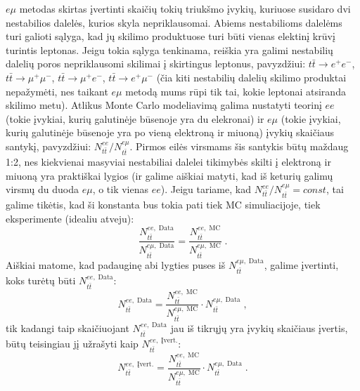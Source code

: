 \documentclass[a4paper, 12pt]{article}
\newlength\q
\begin{document}
$e\mu$ metodas skirtas įvertinti skaičių tokių triukšmo įvykių, kuriuose susidaro dvi nestabilios dalelės, kurios skyla nepriklausomai. Abiems nestabilioms dalelėms turi galioti sąlyga, kad jų skilimo produktuose turi būti vienas elektinį krūvį turintis leptonas. Jeigu tokia sąlyga tenkinama, reiškia yra galimi nestabilių dalelių poros nepriklausomi skilimai į skirtingus leptonus, pavyzdžiui: $t\bar{t}\rightarrow e^{+}e^{-}$, $t\bar{t}\rightarrow\mu^{+}\mu^{-}$, $t\bar{t}\rightarrow\mu^{+}e^{-}$, $t\bar{t}\rightarrow e^{+}\mu^{-}$ (čia kiti nestabilių dalelių skilimo produktai nepažymėti, nes taikant $e\mu$ metodą mums rūpi tik tai, kokie leptonai atsiranda skilimo metu). Atlikus Monte Carlo modeliavimą galima nustatyti teorinį $ee$ (tokie įvykiai, kurių galutinėje būsenoje yra du elekronai) ir $e\mu$ (tokie įvykiai, kurių galutinėje būsenoje yra po vieną elektroną ir miuoną) įvykių skaičiaus santykį, pavyzdžiui: $N_{t\bar{t}}^{ee}/N_{t\bar{t}}^{e\mu}$. Pirmos eilės virsmams šis santykis būtų maždaug 1:2, nes kiekvienai masyviai nestabiliai dalelei tikimybės skilti į elektroną ir miuoną yra praktiškai lygios (ir galime aiškiai matyti, kad iš keturių galimų virsmų du duoda $e\mu$, o tik vienas $ee$). Jeigu tariame, kad $N_{t\bar{t}}^{ee}/N_{t\bar{t}}^{e\mu}=const$, tai galime tikėtis, kad ši konstanta bus tokia pati tiek MC simuliacijoje, tiek eksperimente (idealiu atveju):
\begin{equation}
\frac{N_{t\bar{t}}^{ee , \; \mathrm{Data}}}{N_{t\bar{t}}^{e\mu , \; \mathrm{Data}}}=\frac{N_{t\bar{t}}^{ee , \; \mathrm{MC}}}{N_{t\bar{t}}^{e\mu , \; \mathrm{MC}}} \; .
\label{eq:emuDataMC}
\end{equation}
Aiškiai matome, kad padauginę abi lygties puses iš $N_{t\bar{t}}^{e\mu , \; \mathrm{Data}}$, galime įvertinti, koks turėtų būti $N_{t\bar{t}}^{ee , \; \mathrm{Data}}$:
\begin{equation}
N_{t\bar{t}}^{ee , \; \mathrm{Data}}=\frac{N_{t\bar{t}}^{ee , \; \mathrm{MC}}}{N_{t\bar{t}}^{e\mu , \; \mathrm{MC}}}\cdot N_{t\bar{t}}^{e\mu , \; \mathrm{Data}} \; \mathrm{,}
\label{eq:emuDataMCfix0}
\end{equation}
tik kadangi taip skaičiuojant $N_{t\bar{t}}^{ee , \; \mathrm{Data}}$ jau iš tikrųjų yra įvykių skaičiaus įvertis, būtų teisingiau jį užrašyti kaip $N_{t\bar{t}}^{ee , \; \mathrm{Įvert.}}$:
\begin{equation}
N_{t\bar{t}}^{ee , \; \mathrm{Įvert.}}=\frac{N_{t\bar{t}}^{ee , \; \mathrm{MC}}}{N_{t\bar{t}}^{e\mu , \; \mathrm{MC}}}\cdot N_{t\bar{t}}^{e\mu , \; \mathrm{Data}} \; .
\label{eq:emuDataMCfix}
\end{equation}
\end{document}
